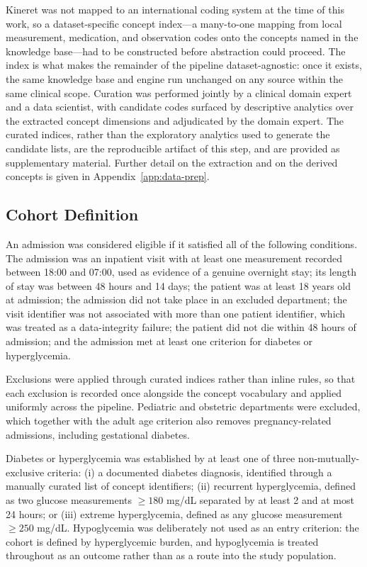 Kineret was not mapped to an international coding system at the time of this
work, so a dataset-specific concept index---a many-to-one mapping from local
measurement, medication, and observation codes onto the concepts named in
the knowledge base---had to be constructed before abstraction could proceed.
The index is what makes the remainder of the pipeline dataset-agnostic: once
it exists, the same knowledge base and engine run unchanged on any source
within the same clinical scope. Curation was performed jointly by a clinical
domain expert and a data scientist, with candidate codes surfaced by
descriptive analytics over the extracted concept dimensions and adjudicated
by the domain expert. The curated indices, rather than the exploratory
analytics used to generate the candidate lists, are the reproducible
artifact of this step, and are provided as supplementary material.
Further detail on the extraction and on the derived concepts is given in
Appendix~\ref{app:data-prep}.

\subsection{Cohort Definition}
\label{sec:cohort-definition}

An admission was considered eligible if it satisfied all of the following
conditions. The admission was an inpatient visit with at least one
measurement recorded between 18:00 and 07:00, used as evidence of a genuine
overnight stay; its length of stay was between 48 hours and 14 days; the
patient was at least 18 years old at admission; the admission did not take
place in an excluded department; the visit identifier was not associated
with more than one patient identifier, which was treated as a data-integrity
failure; the patient did not die within 48 hours of admission; and the
admission met at least one criterion for diabetes or hyperglycemia.

Exclusions were applied through curated indices rather than inline rules, so
that each exclusion is recorded once alongside the concept vocabulary and
applied uniformly across the pipeline. Pediatric and obstetric departments
were excluded, which together with the adult age criterion also removes
pregnancy-related admissions, including gestational diabetes.

Diabetes or hyperglycemia was established by at least one of three
non-mutually-exclusive criteria: (i) a documented diabetes diagnosis,
identified through a manually curated list of concept identifiers;
(ii) recurrent hyperglycemia, defined as two glucose measurements
$\geq180$ mg/dL separated by at least 2 and at most 24 hours; or
(iii) extreme hyperglycemia, defined as any glucose measurement
$\geq250$ mg/dL. Hypoglycemia was deliberately not used as an entry
criterion: the cohort is defined by hyperglycemic burden, and hypoglycemia
is treated throughout as an outcome rather than as a route into the study
population.

